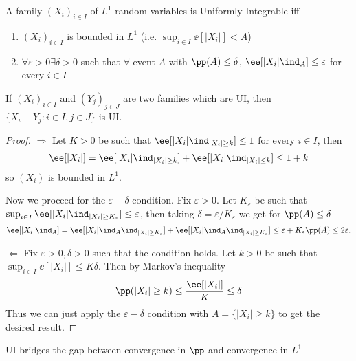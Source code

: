 \documentclass[../main.tex]{subfiles}
\begin{document}
\begin{theorem}
  A family $(X_i)_{i \in I}$ of $L^1$ random variables is Uniformly Integrable
  iff
  \begin{enumerate}
    \item 
      $(X_i)_{i \in I}$ is bounded in $L^1$ (i.e. $\sup_{i \in I} \ee[|X_i|] < A$)
    \item $\forall \varepsilon > 0 \exists \delta > 0$ such that $\forall$ event $A$
  with $\pp(A) \leq \delta$, $\ee[|X_i| \ind_{A}] \leq \varepsilon$ for every $i
  \in I$
  \end{enumerate}
  
\end{theorem}
\begin{corollary}
  If $(X_i)_{i \in I}$ and $(Y_j)_{j \in J}$ are two families which are UI, then
  $\{ X_i + Y_j \colon i \in I, j \in J \} $ is UI.
\end{corollary}
\begin{proof}
  $\boxed{\Rightarrow}$
  Let $K > 0$ be such that $\ee[|X_i| \ind_{|X_i| \geq k}] \leq 1$ for every $i
  \in I$, then 
  $$
  \ee[|X_i|] = \ee[|X_i| \ind_{|X_i| \geq k}] + \ee[|X_i| \ind_{|X_i| \leq k}]
  \leq 1 + k
  $$ 
  so $(X_i)$ is bounded in $L^1$.

  \vspace{0.5em}

  \noindent Now we proceed for the $\varepsilon-\delta$ condition. Fix
  $\varepsilon > 0$. Let $K_{\varepsilon}$ be such that $\sup_{i \in I}
  \ee[|X_i| \ind_{|X_i| \geq K_{\varepsilon}}] \leq \varepsilon$, then taking
  $\delta = \varepsilon / K_{\varepsilon}$ we get for $\pp(A) \leq \delta$
  \[
    \ee[|X_i| \ind_A] = 
    \ee[|X_i| \ind_A \ind_{|X_i| \geq K_{\varepsilon}}] +
    \ee[|X_i| \ind_A \ind_{|X_i| \geq K_{\varepsilon}}] 
    \leq \varepsilon + K_{\varepsilon}\pp(A) \leq 2 \varepsilon
  .\] 

  \vspace{1em}
  $\boxed{\Leftarrow}$ Fix $\varepsilon > 0, \delta > 0$ such that the condition
  holds. Let $k > 0$ be such that $\sup_{i \in I}\ee[|X_i|] \leq K \delta$. Then
  by Markov's inequality
  \[
    \pp(|X_i| \geq k) \leq \frac{\ee[|X_i|]}{K} \leq \delta 
  \] 
  Thus we can just apply the $\varepsilon-\delta$ condition with $A = \{ |X_i|
  \geq k \} $ to get the desired result.
\end{proof}

UI bridges the gap between convergence in $\pp$ and convergence in $L^1$
\end{document}
